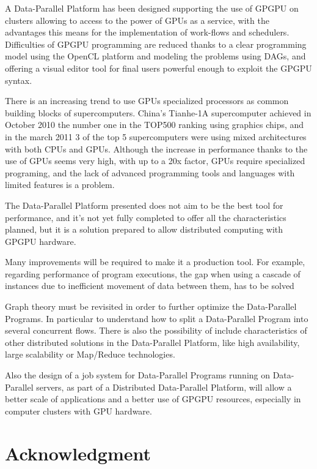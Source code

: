 \documentclass[conference]{IEEEtran}
\begin{document}
A Data-Parallel Platform has been designed supporting the use of GPGPU on
clusters allowing to access to the power of GPUs as a service, with the
advantages this means for the implementation of work-flows and schedulers.
Difficulties of GPGPU programming are reduced thanks to a clear programming
model using the OpenCL platform and modeling the problems using DAGs, and
offering a visual editor tool for final users powerful enough to exploit the
GPGPU syntax.



There is an increasing trend to use GPUs specialized processors as common
building blocks of supercomputers.  China's Tianhe-1A supercomputer achieved in
October 2010 the number one in the TOP500 ranking using graphics chips, and in
the march 2011 3 of the top 5 supercomputers\cite{top500:2011:06} were using
mixed architectures with both CPUs and GPUs.  Although the increase in
performance thanks to the use of GPUs seems very high, with up to a 20x factor,
GPUs require specialized programing, and the lack of advanced programming tools
and languages with limited features is a problem\cite{varhol:de:2010}.


The Data-Parallel Platform presented does not aim to be the best tool for
performance, and it's not yet fully completed to offer all the characteristics
planned, but it is a solution prepared to allow distributed computing with GPGPU
hardware.

Many improvements will be required to make it a production tool.  For example,
regarding performance of program executions, the gap when using a cascade of
instances due to inefficient movement of data between them, has to be solved

Graph theory must be revisited in order to further optimize the Data-Parallel
Programs.  In particular to understand how to split a Data-Parallel Program into
several concurrent flows.  There is also the possibility of include
characteristics of other distributed solutions in the Data-Parallel Platform,
like high availability, large scalability or Map/Reduce technologies.

Also the design of a job system for Data-Parallel Programs running on
Data-Parallel servers, as part of a Distributed Data-Parallel Platform, will
allow a better scale of applications and a better use of GPGPU resources,
especially in computer clusters with GPU hardware.

\section*{Acknowledgment}
\end{document}
